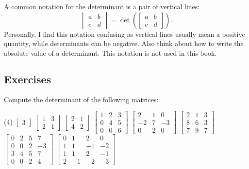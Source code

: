 %

\medskip


A common notation for the determinant is a pair of vertical
lines:
\begin{equation*}
\begin{vmatrix}
a & b \\
c & d
\end{vmatrix}
=
\det \left(
\begin{bmatrix}
a & b \\
c & d
\end{bmatrix}
\right) .
\end{equation*}
Personally, I find this notation confusing as vertical lines usually
mean a positive quantity, while determinants can be negative.  Also
think about how to write the absolute value of a determinant.
This notation is not used in this book.

\subsection{Exercises}

\begin{exercise}
Compute the determinant of the following matrices:
\begin{tasks}(4)
\task
$\begin{bmatrix}
3
\end{bmatrix}$
\task
$\begin{bmatrix}
1 & 3 \\
2 & 1
\end{bmatrix}$
\task
$\begin{bmatrix}
2 & 1 \\
4 & 2
\end{bmatrix}$
\task
$\begin{bmatrix}
1 & 2 & 3 \\
0 & 4 & 5 \\
0 & 0 & 6
\end{bmatrix}$
\task
$\begin{bmatrix}
2 & 1 & 0 \\
-2 & 7 & -3 \\
0 & 2 & 0
\end{bmatrix}$
\task
$\begin{bmatrix}
2 & 1 & 3 \\
8 & 6 & 3 \\
7 & 9 & 7
\end{bmatrix}$
\task
$\begin{bmatrix}
0 & 2 & 5 & 7 \\
0 & 0 & 2 & -3 \\
3 & 4 & 5 & 7 \\
0 & 0 & 2 & 4
\end{bmatrix}$
\task
$\begin{bmatrix}
0 &  1 &  2 &  0 \\
1 &  1 & -1 & -2 \\
1 &  1 &  2 & -1 \\
2 & -1 & -2 & -3
\end{bmatrix}$
\end{tasks}
\end{exercise}

